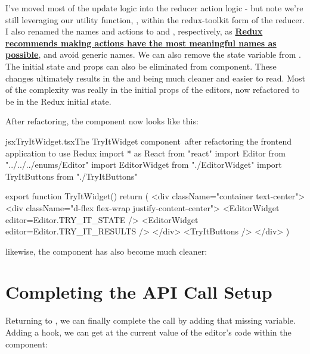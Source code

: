 \documentclass[paper=6in:9in,pagesize=pdftex,headinclude=on,footinclude=on,12pt,twoside]{scrbook}
\newcommand{\link}[2]{\textbf{\textcolor{monokaiPink}{\href{#2}{#1}}}}
\begin{document}
I've moved most of the  update logic into the reducer action logic - but note we're still leveraging our utility function, , within the redux-toolkit form of the reducer. I also renamed the names  and  actions to  and , respectively, as \link{Redux recommends making actions have the most meaningful names as possible}{https://redux.js.org/style-guide/style-guide\#write-meaningful-action-names}, and avoid generic names. We can also remove the state variable from . The initial state and props can also be eliminated from  component. These changes ultimately results in the  and  being much cleaner and easier to read. Most of the complexity was really in the initial props of the editors, now refactored to be in the Redux initial state.

After refactoring, the  component now looks like this:

\begin{codeInput}{jsx}{TryItWidget.tsx}{The TryItWidget component\, after refactoring the frontend application to use Redux}
import * as React from "react"
import Editor from "../../../enums/Editor"
import { EditorWidget } from "./EditorWidget"
import { TryItButtons } from "./TryItButtons"

export function TryItWidget() {
  return (
    <div className="container text-center">
      <div className="d-flex flex-wrap justify-content-center">
        <EditorWidget editor={Editor.TRY_IT_STATE} />
        <EditorWidget editor={Editor.TRY_IT_RESULTS} />
      </div>
      <TryItButtons />
    </div>
  )
}
\end{codeInput}

likewise, the  component has also become much cleaner:


\section{Completing the API Call Setup}

Returning to , we can finally complete the call by adding that missing  variable. Adding a  hook, we can get at the current value of the editor's code within the  component: 
\end{document}
